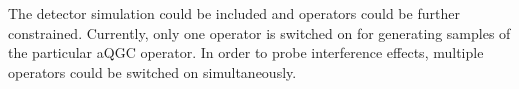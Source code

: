 The detector simulation could be included and operators could be further constrained. Currently, only one operator is switched on for generating samples of the particular aQGC operator. In order to probe interference effects, multiple operators could be switched on simultaneously. 

%
%
%
%
%
